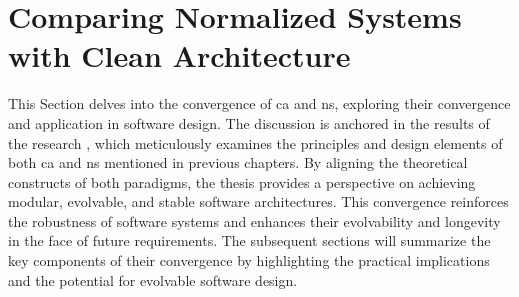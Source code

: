 \section{Comparing Normalized Systems with Clean Architecture}

This Section delves into the convergence of \gls{ca} and \gls{ns}, exploring their
convergence and application in software design. The discussion is anchored in the results
of the research   \cite{koks_convergence_2023}, which
meticulously examines the principles and design elements of both \gls{ca} and \gls{ns}
mentioned in previous chapters. By aligning the theoretical constructs of both paradigms,
the thesis provides a perspective on achieving modular, evolvable, and stable software
architectures. This convergence reinforces the robustness of software systems and enhances
their evolvability and longevity in the face of future requirements. The subsequent
sections will summarize the key components of their convergence by highlighting the
practical implications and the potential for evolvable software design.